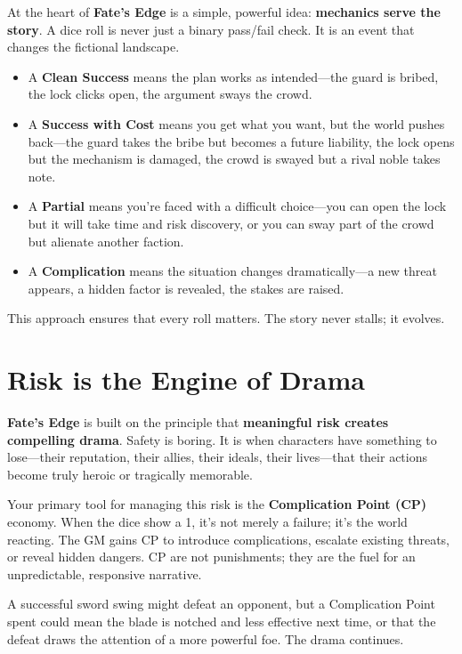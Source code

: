 At the heart of \textbf{Fate's Edge} is a simple, powerful idea: \textbf{mechanics serve the story}. A dice roll is never just a binary pass/fail check. It is an event that changes the fictional landscape.

\begin{itemize}
    \item A \textbf{Clean Success} means the plan works as intended—the guard is bribed, the lock clicks open, the argument sways the crowd.
    \item A \textbf{Success with Cost} means you get what you want, but the world pushes back—the guard takes the bribe but becomes a future liability, the lock opens but the mechanism is damaged, the crowd is swayed but a rival noble takes note.
    \item A \textbf{Partial} means you're faced with a difficult choice—you can open the lock but it will take time and risk discovery, or you can sway part of the crowd but alienate another faction.
    \item A \textbf{Complication} means the situation changes dramatically—a new threat appears, a hidden factor is revealed, the stakes are raised.
\end{itemize}

This approach ensures that every roll matters. The story never stalls; it evolves.

\section*{Risk is the Engine of Drama}

\textbf{Fate's Edge} is built on the principle that \textbf{meaningful risk creates compelling drama}. Safety is boring. It is when characters have something to lose—their reputation, their allies, their ideals, their lives—that their actions become truly heroic or tragically memorable.

Your primary tool for managing this risk is the \textbf{Complication Point (CP)} economy. When the dice show a 1, it's not merely a failure; it's the world reacting. The GM gains CP to introduce complications, escalate existing threats, or reveal hidden dangers. CP are not punishments; they are the fuel for an unpredictable, responsive narrative.

A successful sword swing might defeat an opponent, but a Complication Point spent could mean the blade is notched and less effective next time, or that the defeat draws the attention of a more powerful foe. The drama continues.


